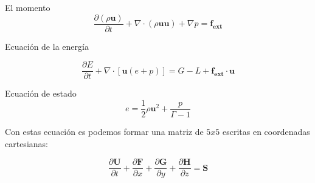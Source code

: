 \documentclass[12pt,a4paper]{book}
\begin{document}
El momento
\begin{equation}  \label{conservación  _momento_hidrodinamica}
\dfrac{\partial \left( \rho \mathbf{u} \right) }{\partial t}+ \nabla \cdot \left( \rho \mathbf{u u} \right) + \nabla p = \mathbf{f_{ext}}
\end{equation}

Ecuación de la energía

\begin{equation} \label{conservación  _energia_hidrodinamica}
\dfrac{\partial E }{\partial t} + \nabla \cdot \left[ \mathbf{u} \left( e+p \right) \right] =G-L+\mathbf{f_{ext} \cdot \mathbf{u}}
\end{equation}

Ecuación de estado
\begin{equation}
e=\frac{1}{2} \rho \mathbf{u}^{2} + \frac{p}{\Gamma - 1}
\end{equation}

Con estas ecuación  es podemos formar una matriz de $5x5$ escritas en coordenadas cartesianas:

\begin{equation} \label{euler_cartesianas}
\dfrac{\partial \mathbf{U}}{\partial t}+\dfrac{\partial \mathbf{F}}{\partial x}+\dfrac{\partial \mathbf{G}}{\partial y}+\dfrac{\partial \mathbf{H}}{\partial z}= \mathbf{S}
\end{equation}
\end{document}
